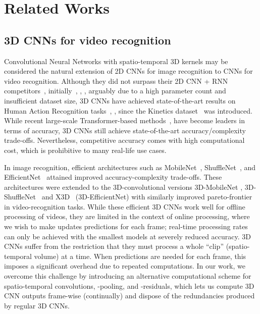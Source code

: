 \documentclass[runningheads]{llncs}
\begin{document}
\section{Related Works} \label{sec:related-work}
\vspace{-3pt}
\subsection{3D CNNs for video recognition}
\vspace{-3pt}
Convolutional Neural Networks with spatio-temporal 3D kernels may be considered the natural extension of 2D CNNs for image recognition to CNNs for video recognition.
Although they did not surpass their 2D CNN + RNN competitors~\cite{donahue2015longterm}, \cite{yuehei2015beyond} initially~\cite{ji20133dconv}, \cite{karpathy2014largescale}, \cite{tran2015learning}, arguably due to a high parameter count and insufficient dataset size, 3D CNNs have achieved state-of-the-art results on Human Action Recognition tasks~\cite{carreira2017quo}, \cite{tran2018closer}, \cite{feichtenhofer2019slowfast} since the Kinetics dataset~\cite{kay2017kinetics} was introduced.
While recent large-scale Transformer-based methods~\cite{arnab2021vivit}, \cite{neimark2021video} have become leaders in terms of accuracy, 3D CNNs still achieve state-of-the-art accuracy/complexity trade-offs. 
Nevertheless, competitive accuracy comes with high computational cost, which is prohibitive to many real-life use cases.

In image recognition, efficient architectures such as MobileNet~\cite{howard2017mobilenet}, ShuffleNet~\cite{zhang2018shufflenet}, and EfficientNet~\cite{mingxing2019efficientnet} attained improved accuracy-complexity trade-offs.
These architectures were extended to the 3D-convolutional versions {3D-MobileNet} \cite{kopulku2019resource}, {3D-ShuffleNet}~\cite{kopulku2019resource} and X3D~\cite{feichtenhofer2020x3d} ({3D-EfficientNet}) with similarly improved pareto-frontier in video-recognition tasks. 
While these efficient 3D CNNs work well for offline processing of videos, they are limited in the context of online processing, where we wish to make updates predictions for each frame; real-time processing rates can only be achieved with the smallest models at severely reduced accuracy.
3D CNNs suffer from the restriction that they must process a whole ``clip'' (spatio-temporal volume) at a time. When predictions are needed for each frame, this imposes a significant overhead due to repeated computations. In our work, we overcome this challenge by introducing an alternative computational scheme for spatio-temporal convolutions, -pooling, and -residuals, which lets us compute 3D CNN outputs frame-wise (continually) and dispose of the redundancies produced by regular 3D CNNs.
\end{document}
